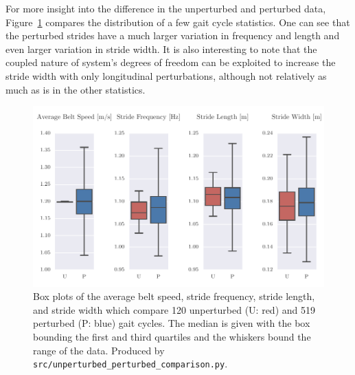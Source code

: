 \documentclass[fleqn,12pt]{wlpeerj}
\begin{document}
For more insight into the difference in the unperturbed and perturbed data,
Figure~\ref{fig:gait-cycle-stats-comparison} compares the distribution of a few
gait cycle statistics. One can see that the perturbed strides have a much
larger variation in frequency and length and even larger variation in stride
width. It is also interesting to note that the coupled nature of system's
degrees of freedom can be exploited to increase the stride width with only
longitudinal perturbations, although not relatively as much as is in the other
statistics.
%
\begin{figure}
  \centering
  \includegraphics{figures/unperturbed-perturbed-boxplot-comparison.pdf}
  \cprotect\caption{Box plots of the average belt speed, stride frequency,
    stride length, and stride width which compare 120 unperturbed (U: red) and
    519 perturbed (P: blue) gait cycles. The median is given with the box
    bounding the first and third quartiles and the whiskers bound the range of
    the data. Produced by \verb|src/unperturbed_perturbed_comparison.py|.}
  \label{fig:gait-cycle-stats-comparison}
\end{figure}
\end{document}
